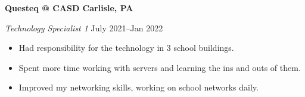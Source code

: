 \textbf{Questeq @ CASD \hfill  Carlisle, PA} \par
\textit{Technology Specialist 1} \hfill July 2021--Jan 2022 \par
\begin{itemize}
	\item Had responsibility for the technology in 3 school buildings.
	\item Spent more time working with servers and learning the ins and outs of them.
	\item Improved my networking skills, working on school networks daily.
\end{itemize} \par